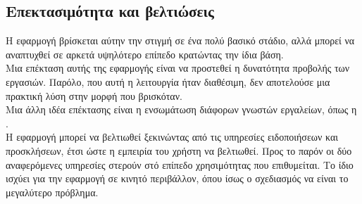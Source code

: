 \subsection*{Επεκτασιμότητα και βελτιώσεις}
\pSpace Η εφαρμογή βρίσκεται αύτην την στιγμή σε ένα πολύ βασικό στάδιο, αλλά μπορεί να αναπτυχθεί σε αρκετά υψηλότερο επίπεδο κρατώντας την ίδια βάση.\\
\pSpace Μια επέκταση αυτής της εφαρμογής είναι να προστεθεί η δυνατότητα προβολής  των εργασιών. Παρόλο, που αυτή η λειτουργία ήταν διαθέσιμη, δεν αποτελούσε μια πρακτική λύση στην μορφή που βρισκόταν.\\
\pSpace Μια άλλη ιδέα επέκτασης είναι η ενσωμάτωση διάφορων γνωστών εργαλείων, όπως  η .\\
\pSpace Η εφαρμογή μπορεί να βελτιωθεί ξεκινώντας από τις υπηρεσίες ειδοποιήσεων και προσκλήσεων, έτσι ώστε η εμπειρία του χρήστη να βελτιωθεί. Προς το παρόν οι δύο αναφερόμενες υπηρεσίες στερούν στό επίπεδο χρησιμότητας που επιθυμείται. Το ίδιο ισχύει για την εφαρμογή σε κινητό περιβάλλον, όπου ίσως ο σχεδιασμός να είναι το μεγαλύτερο πρόβλημα.